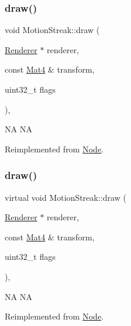 \subsubsection{\texorpdfstring{draw()}{draw()}\hspace{0.1cm}{\footnotesize\ttfamily [1/2]}}
{\footnotesize\ttfamily void Motion\+Streak\+::draw (\begin{DoxyParamCaption}\item[{\hyperlink{classRenderer}{Renderer} $\ast$}]{renderer,  }\item[{const \hyperlink{classMat4}{Mat4} \&}]{transform,  }\item[{uint32\+\_\+t}]{flags }\end{DoxyParamCaption})\hspace{0.3cm}{\ttfamily [override]}, {\ttfamily [virtual]}}

NA  NA 

Reimplemented from \hyperlink{classNode_abcf85087a15901deb7c6c1231634c8ab}{Node}.

\mbox{\label{classMotionStreak_a5cde4c7320bde796324d67ac11125a1f}} 
\subsubsection{\texorpdfstring{draw()}{draw()}\hspace{0.1cm}{\footnotesize\ttfamily [2/2]}}
{\footnotesize\ttfamily virtual void Motion\+Streak\+::draw (\begin{DoxyParamCaption}\item[{\hyperlink{classRenderer}{Renderer} $\ast$}]{renderer,  }\item[{const \hyperlink{classMat4}{Mat4} \&}]{transform,  }\item[{uint32\+\_\+t}]{flags }\end{DoxyParamCaption})\hspace{0.3cm}{\ttfamily [override]}, {\ttfamily [virtual]}}

NA  NA 

Reimplemented from \hyperlink{classNode_abcf85087a15901deb7c6c1231634c8ab}{Node}.

\mbox{\label{classMotionStreak_ab3949fdfcb758670a815a114799a274d}} 
